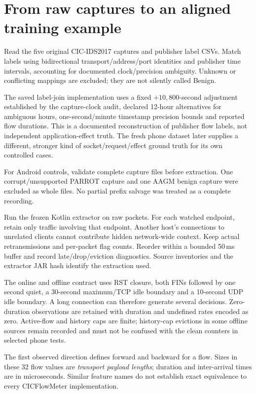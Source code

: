 \documentclass[11pt,a4paper,oneside]{report}
\begin{document}
\section{From raw captures to an aligned training example}
Read the five original CIC-IDS2017 captures and publisher label CSVs. Match labels using bidirectional transport/address/port identities and publisher time intervals, accounting for documented clock/precision ambiguity. Unknown or conflicting mappings are excluded; they are not silently called Benign.

The saved label-join implementation uses a fixed $+10{,}800$-second adjustment established by the capture-clock audit, declared 12-hour alternatives for ambiguous hours, one-second/minute timestamp precision bounds and reported flow durations. This is a documented reconstruction of publisher flow labels, not independent application-effect truth. The fresh phone dataset later supplies a different, stronger kind of socket/request/effect ground truth for its own controlled cases.

For Android controls, validate complete capture files before extraction. One corrupt/unsupported PARROT capture and one AAGM benign capture were excluded as whole files. No partial prefix salvage was treated as a complete recording.

Run the frozen Kotlin extractor on raw packets. For each watched endpoint, retain only traffic involving that endpoint. Another host's connections to unrelated clients cannot contribute hidden network-wide context. Keep actual retransmissions and per-packet flag counts. Reorder within a bounded 50\,ms buffer and record late/drop/eviction diagnostics. Source inventories and the extractor JAR hash identify the extraction used.

The online and offline contract uses RST closure, both FINs followed by one second quiet, a 30-second maximum/TCP idle boundary and a 10-second UDP idle boundary. A long connection can therefore generate several decisions. Zero-duration observations are retained with duration and undefined rates encoded as zero. Active-flow and history caps are finite; history-cap evictions in some offline sources remain recorded and must not be confused with the clean counters in selected phone tests.

The first observed direction defines forward and backward for a flow. Sizes in these 32 flow values are \emph{transport payload lengths}; duration and inter-arrival times are in microseconds. Similar feature names do not establish exact equivalence to every CICFlowMeter implementation.
\end{document}
